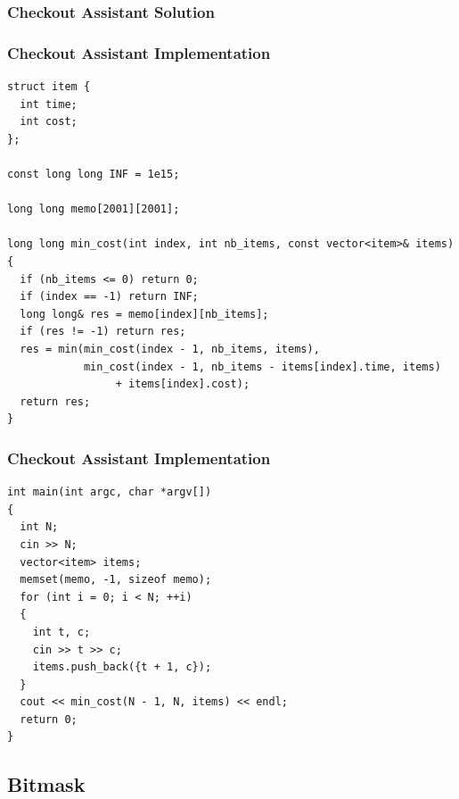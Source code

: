 \documentclass{beamer}
\begin{document}
\begin{frame}%
\frametitle{Checkout Assistant Solution}

\end{frame}

\begin{frame}[containsverbatim]
\frametitle{Checkout Assistant Implementation}
\scriptsize

\begin{lstlisting}
struct item {
  int time;
  int cost;
};

const long long INF = 1e15;

long long memo[2001][2001];

long long min_cost(int index, int nb_items, const vector<item>& items) {
  if (nb_items <= 0) return 0;
  if (index == -1) return INF;
  long long& res = memo[index][nb_items];
  if (res != -1) return res;
  res = min(min_cost(index - 1, nb_items, items),
            min_cost(index - 1, nb_items - items[index].time, items)
                 + items[index].cost);
  return res;
}
\end{lstlisting}

\end{frame}

\begin{frame}[containsverbatim]
\frametitle{Checkout Assistant Implementation}
\scriptsize

\begin{lstlisting}
int main(int argc, char *argv[])
{
  int N;
  cin >> N;
  vector<item> items;
  memset(memo, -1, sizeof memo);
  for (int i = 0; i < N; ++i)
  {
    int t, c;
    cin >> t >> c;
    items.push_back({t + 1, c});
  }
  cout << min_cost(N - 1, N, items) << endl;
  return 0;
}
\end{lstlisting}

\end{frame}

\fi

\subsection{Bitmask}
\end{document}
